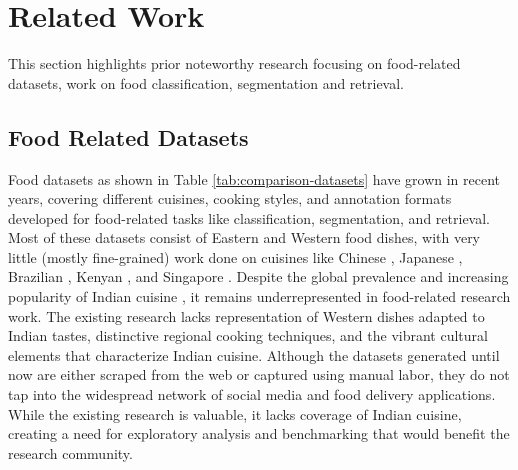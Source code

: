 \documentclass{article}
\begin{document}
\section{Related Work}
\label{sec:related}

This section highlights prior noteworthy research focusing on food-related datasets, work on food classification, segmentation and retrieval.

\subsection{Food Related Datasets}
\label{subsec:related-data}

Food datasets as shown in Table \ref{tab:comparison-datasets} have grown in recent years, covering different cuisines, cooking styles, and annotation formats developed for food-related tasks like classification, segmentation, and retrieval. Most of these datasets consist of Eastern and Western food dishes, with very little (mostly fine-grained) work done on cuisines like Chinese \cite{arxiv.1705.02743}, Japanese \cite{Jianing2019}, Brazilian \cite{arxiv.2012.03087}, Kenyan \cite{Jalal2019}, and Singapore \cite{Sahoo2019}.  Despite the global prevalence and increasing popularity of Indian cuisine \cite{tasteatlas}, it remains underrepresented in food-related research work. The existing research lacks representation of Western dishes adapted to Indian tastes, distinctive regional cooking techniques, and the vibrant cultural elements that characterize Indian cuisine. Although the datasets generated until now are either scraped from the web or captured using manual labor, they do not tap into the widespread network of social media and food delivery applications. While the existing research is valuable, it lacks coverage of Indian cuisine, creating a need for exploratory analysis and benchmarking that would benefit the research community.
\end{document}
